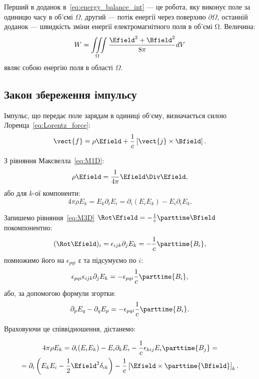 Перший в доданок в~\eqref{eq:energy_balance_int} --- це робота, яку виконує поле за одиницю часу
в об’ємі $\Omega$, другий --- потік енергії через поверхню $\partial\Omega$, останній доданок ---
швидкість зміни енергії електромагнітного поля в об’ємі Ω. Величина:
\begin{equation}
	W = \iiint\limits_{\Omega}     \frac{\Efield^2 + \Bfield^2}{8\pi} dV
\end{equation}
являє собою енергію поля в області $\Omega$.


\subsection*{Закон збереження імпульсу}

Імпульс, що передає поле зарядам в одиниці об`єму, визначається силою
Лоренца~\eqref{eq:Lorentz_force}:
\begin{equation*}
	\vect{f} = \rho\Efield + \frac1c\left[\vect{j}\times\Bfield\right].
\end{equation*}

З рівняння Максвелла~\eqref{eq:M1D}:
\begin{equation*}
	\rho\Efield = \frac1{4\pi}\Efield\Div\Efield,
\end{equation*}
або для $k$-ої компоненти:
\begin{equation*}
	4\pi\rho E_k = E_k\partial_iE_i = \partial_i(E_iE_k) - E_i \partial_iE_k.
\end{equation*}

Запишемо рівняння~\eqref{eq:M3D} $\Rot\Efield = - \frac1c \parttime\Bfield$ покомпонентно:
\begin{equation*}
	(\Rot\Efield)_i = \epsilon_{ijk}\partial_j E_k = - \frac1c \parttime{B_i},
\end{equation*}
помножимо його на $\epsilon_{pqi}$ ε та підсумуємо по $i$:
\begin{equation*}
	\epsilon_{pqi}\epsilon_{ijk}\partial_j E_k = - \epsilon_{pqi}  \frac1c \parttime{B_i},
\end{equation*}
або, за допомогою формули згортки:
\begin{equation*}
	\partial_pE_q -  \partial_qE_p = - \epsilon_{pqi}  \frac1c \parttime{B_i}.
\end{equation*}

Враховуючи це співвідношення, дістанемо:

\begin{multline*}
	4\pi\rho E_k =  \partial_i(E_iE_k) - E_i \partial_kE_i - \frac1c \epsilon_{kij} E_i \parttime{B_j} = \\
	= \partial_i\left( E_kE_i - \frac12
	\Efield^2\delta_{ik}\right) - \frac1c \left[ \Efield \times \parttime{\Bfield}\right]_k .
\end{multline*}

